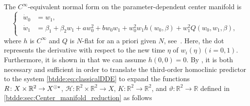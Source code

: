 The $C^\infty$-equivalent normal form on the parameter-dependent
center manifold is
\begin{equation}
\label{btdde:eq:normal_form_orbital}
\begin{cases}
\begin{aligned}
	\dot w_0 & =  w_1, \\
	\dot w_1 & =  \beta_1 + \beta_2 w_1 + aw_0^2 + b w_0 w_1 + w_0^2 w_1
								h(w_0,\beta) + w_1^2 Q(w_0,w_1,\beta),
\end{aligned}
\end{cases}
\end{equation}
where $h$ is $C^\infty$ and $Q$ is $N$-flat for an a priori given $N$,
see~\cite{Broer1991}. Here, the dot represents the derivative with respect to
the new time $\eta$ of $w_i(\eta)(i = 0,1)$.  Furthermore, it is shown in
\cite{Bosschaert@Interplay} that we can assume $h(0,0) = 0$. 
By \cite[Proposition 1]{Bosschaert@Interplay}, it is both necessary and sufficient
in order to translate the third-order homoclinic predictor to the system
\cref{btdde:eq:classicalDDE} to expand the functions $R \colon X \times \mathbb R^2 \rightarrow X^{\odot\star}$, 
$\mathcal{H} \colon \mathbb R^2 \times \mathbb R^2 \rightarrow X$,
$K \colon \mathbb R^2 \rightarrow \mathbb R^2$, and $\vartheta \colon \mathbb R^2 \rightarrow \mathbb R$ 
 defined in \cref{btdde:sec:Center_manifold_reduction}
as follows
%
